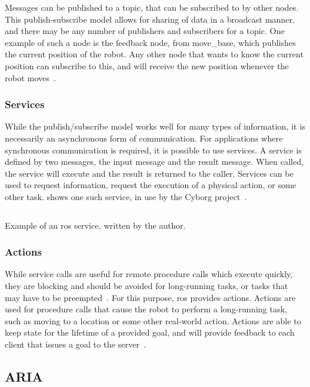 \documentclass[\rootfolder/main.tex]{subfiles}
\begin{document}
Messages can be published to a topic, that can be subscribed to by other nodes.
This publish-subscribe model allows for sharing of data in a broadcast manner, and there may be any number of publishers and subscribers for a topic.
One example of such a node is the feedback node, from move\_base, which publishes the current position of the robot.
Any other node that wants to know the current position can subscribe to this, and will receive the new position whenever the robot moves~\cite{Quigley2009}.

\subsubsection{Services}

While the publish/subscribe model works well for many types of information, it is necessarily an asynchronous form of communication.
For applications where synchronous communication is required, it is possible to use services.
A service is defined by two messages, the input message and the result message.
When called, the service will execute and the result is returned to the caller.
Services can be used to request information, request the execution of a physical action, or some other task.
 shows one such service, in use by the Cyborg project~\cite{Quigley2009}.

\begin{listing}
    \inputminted{python}{\rootfolder/Chapters/Chapter2/Listings/distance_to_goal.py}
    \caption{Example of an \acrshort{ros} service, written by the author.}
    \label{lst:ros_service}
\end{listing}

\subsubsection{Actions}

While service calls are useful for remote procedure calls which execute quickly, they are blocking and should be avoided for long-running tasks, or tasks that may have to be preempted~\cite{ROS}.
For this purpose, \acrshort{ros} provides actions.
Actions are used for procedure calls that cause the robot to perform a long-running task, such as moving to a location or some other real-world action.
Actions are able to keep state for the lifetime of a provided goal, and will provide feedback to each client that issues a goal to the server~\cite{Quigley2009}.

\subsection{ARIA}
\end{document}

